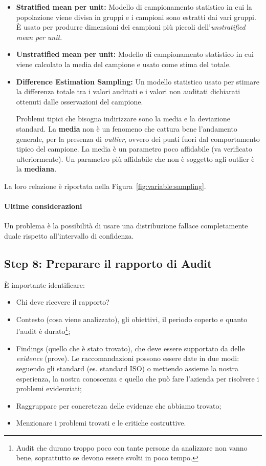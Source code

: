 \begin{itemize}
  \item \textbf{Stratified mean per unit:}
  Modello di campionamento statistico in cui la popolazione
  viene divisa in gruppi e i campioni sono estratti dai vari
  gruppi. È usato per produrre dimensioni dei campioni più piccoli
  dell'\textit{unstratified mean per unit}.
  
  \item \textbf{Unstratified mean per unit:}
  Modello di campionamento statistico in cui viene calcolato la media
  del campione e usato come stima del totale.
  
  \item \textbf{Difference Estimation Sampling:} Un modello statistico
  usato per stimare la differenza totale
  tra i valori auditati e i valori non auditati dichiarati ottenuti
  dalle osservazioni del campione.
  
  Problemi tipici che bisogna indirizzare sono la media e la deviazione
  standard. La \textbf{media} non è un fenomeno che cattura bene l'andamento
  generale, per la presenza di \textit{outlier}, ovvero dei punti fuori dal
  comportamento tipico del campione. La media è un parametro poco affidabile 
  (va verificato ulteriormente). Un parametro più affidabile che non è soggetto
  agli outlier è la \textbf{mediana}.
\end{itemize}

La loro relazione è riportata nella Figura~\ref{fig:variable:sampling}.


\paragraph*{Ultime considerazioni}
Un problema è la possibilità di usare una
distribuzione fallace completamente duale rispetto all'intervallo di
confidenza.



\subsection{Step 8: Preparare il rapporto di Audit}

È importante identificare:
\begin{itemize}
\item Chi deve ricevere il rapporto?
\item Contesto (cosa viene analizzato), gli obiettivi, il periodo coperto e
quanto l'audit è durato\footnote{Audit che durano troppo poco con tante persone
da analizzare non vanno bene, soprattutto se devono essere svolti in poco
tempo.};
\item Findings (quello che è stato trovato), che deve essere supportato da delle
\emph{evidence} (prove). Le raccomandazioni possono essere date in due modi:
seguendo gli standard (es. standard ISO) o mettendo assieme la nostra
esperienza, la nostra conoscenza e quello che può fare l'azienda per risolvere i
problemi evidenziati;
\item Raggruppare per concretezza delle evidenze che abbiamo trovato;
\item Menzionare i problemi trovati e le critiche costruttive.
\end{itemize}


